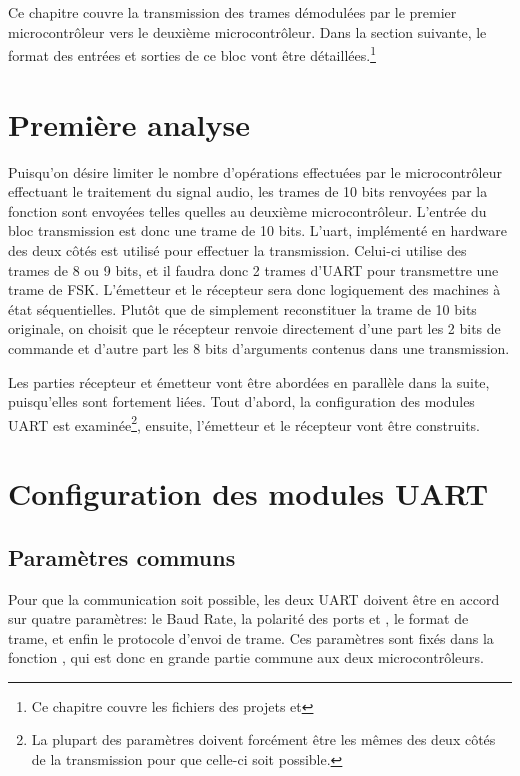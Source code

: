 Ce chapitre couvre la transmission des trames démodulées par le premier microcontrôleur vers le deuxième microcontrôleur. Dans la section suivante, le format des entrées et sorties de ce bloc vont être détaillées.\footnote{Ce chapitre couvre les fichiers  des projets  et }

\section{Première analyse}
Puisqu'on désire limiter le nombre d'opérations effectuées par le microcontrôleur effectuant le traitement du signal audio, les trames de 10 bits renvoyées par la fonction  sont envoyées telles quelles au deuxième microcontrôleur. L'entrée du bloc transmission est donc une trame de 10 bits. L'uart, implémenté en hardware des deux côtés est utilisé pour effectuer la transmission. Celui-ci utilise des trames de 8 ou 9 bits, et il faudra donc 2 trames d'UART pour transmettre une trame de FSK. L'émetteur et le récepteur sera donc logiquement des machines à état séquentielles. Plutôt que de simplement reconstituer la trame de 10 bits originale, on choisit que le récepteur renvoie directement d'une part les 2 bits de commande et d'autre part les 8 bits d'arguments contenus dans une transmission.

Les parties récepteur et émetteur vont être abordées en parallèle dans la suite, puisqu'elles sont fortement liées. Tout d'abord, la configuration des modules UART est examinée\footnote{La plupart des paramètres doivent forcément être les mêmes des deux côtés de la transmission pour que celle-ci soit possible.}, ensuite, l'émetteur et le récepteur vont être construits.

\section{Configuration des modules UART}
\subsection{Paramètres communs}
Pour que la communication soit possible, les deux UART doivent être en accord sur quatre paramètres: le Baud Rate, la polarité des ports  et , le format de trame, et enfin le protocole d'envoi de trame.
Ces paramètres sont fixés dans la fonction , qui est donc en grande partie commune aux deux microcontrôleurs.

